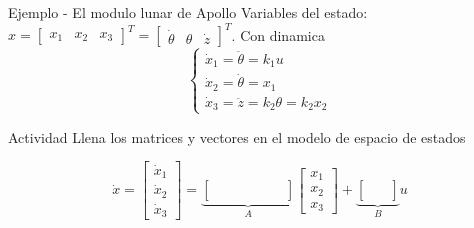 \documentclass[presentation,aspectratio=1610]{beamer}
\begin{document}
\begin{frame}[label={sec:orgddf4b9f}]{Ejemplo - El modulo lunar de Apollo}
Variables del estado: \(x = \begin{bmatrix} x_1 & x_2 & x_3 \end{bmatrix}^T = \begin{bmatrix} \dot{\theta} & \theta & \dot{z} \end{bmatrix}^T\). Con dinamica
\[ \begin{cases} \dot{x}_1 =  \ddot{\theta} = k_1 u\\ \dot{x}_2 = \dot{\theta} = x_1\\ \dot{x}_3 = \ddot{z} = k_2\theta = k_2x_2 \end{cases} \]

\alert{Actividad} Llena los matrices y vectores en el modelo de espacio de estados

\[ \dot{x} = \begin{bmatrix} \dot{x}_1\\\dot{x}_2\\\dot{x}_3\end{bmatrix} = \underbrace{\begin{bmatrix} \quad & \quad &\quad \\\quad & \quad& \quad\\ \quad& \quad &\quad \end{bmatrix}}_{A} \begin{bmatrix} x_1\\x_2\\x_3\end{bmatrix} + \underbrace{\begin{bmatrix} \quad \\ \quad \\\quad  \end{bmatrix}}_{B} u \]
\end{frame}
\end{document}

